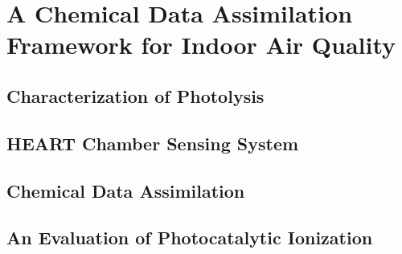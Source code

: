 \chapter{A Chemical Data Assimilation Framework for Indoor Air Quality}

\section{Characterization of Photolysis}
\section{HEART Chamber Sensing System}
\section{Chemical Data Assimilation}
\section{An Evaluation of Photocatalytic Ionization}



